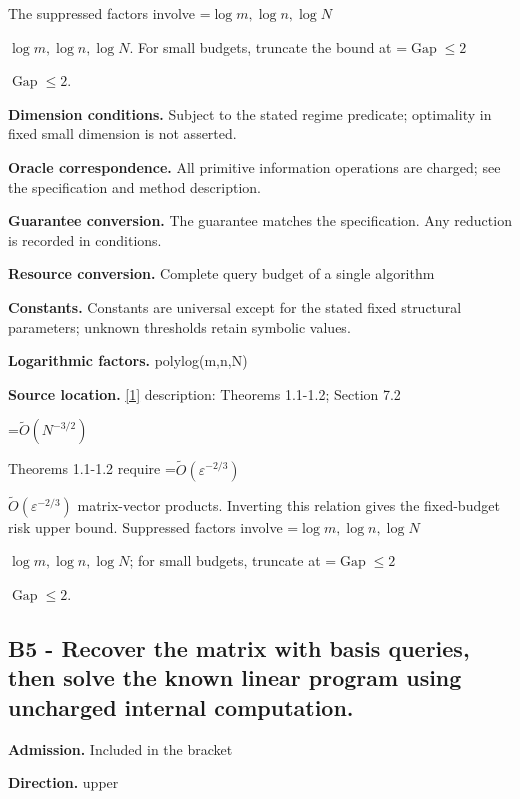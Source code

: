 \documentclass[10pt,a4paper]{article}
\newcommand{\AtlasMath}[1]{\par\begingroup\centering\setbox0=\hbox{$\displaystyle #1$}\ifdim\wd0>1.4\linewidth\typeout{ATLAS WIDE FORMULA: \the\wd0}\fi\ifdim\wd0>\linewidth\resizebox{\linewidth}{!}{\box0}\else\box0\fi\par\endgroup}
\newcommand{\AtlasInlineMath}[1]{\begingroup\setbox0=\hbox{$#1$}\ifdim\wd0>.4\linewidth\endgroup\AtlasMath{#1}\else\endgroup$#1$\fi}
\begin{document}
The suppressed factors involve \AtlasInlineMath{\log m,\log n,\log N}. For small budgets, truncate the bound at \AtlasInlineMath{\operatorname{Gap}\le2}.



\textbf{Dimension conditions.} Subject to the stated regime predicate; optimality in fixed small dimension is not asserted.



\textbf{Oracle correspondence.} All primitive information operations are charged; see the specification and method description.



\textbf{Guarantee conversion.} The guarantee matches the specification. Any reduction is recorded in conditions.



\textbf{Resource conversion.} Complete query budget of a single algorithm



\textbf{Constants.} Constants are universal except for the stated fixed structural parameters; unknown thresholds retain symbolic values.



\textbf{Logarithmic factors.} polylog(m,n,N)



\textbf{Source location.} \href{https://arxiv.org/pdf/2601.02347v3}{[1]} description: Theorems 1.1-1.2; Section 7.2



\AtlasMath{\widetilde O(N^{-3/2})}


Theorems 1.1-1.2 require \AtlasInlineMath{\widetilde O(\varepsilon^{-2/3})} matrix-vector products. Inverting this relation gives the fixed-budget risk upper bound. Suppressed factors involve \AtlasInlineMath{\log m,\log n,\log N}; for small budgets, truncate at \AtlasInlineMath{\operatorname{Gap}\le2}.



\subsection{B5 - Recover the matrix with basis queries, then solve the known linear program using uncharged internal computation.}


\textbf{Admission.} Included in the bracket



\textbf{Direction.} upper
\end{document}
